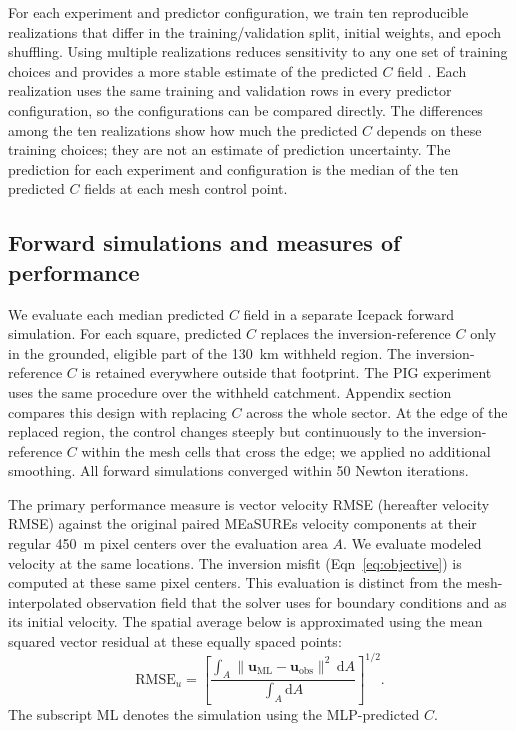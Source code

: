 \documentclass[review,jog]{igs}
\begin{document}
For each experiment and predictor configuration, we train ten reproducible
realizations that differ in the training/validation split, initial weights, and
epoch shuffling. Using multiple realizations reduces sensitivity to any one
set of training choices and provides a more stable estimate of the predicted
$C$ field \citep{hansen1990neural,breiman1996bagging}. Each realization uses the same training and validation rows in every predictor configuration, so the configurations can be compared directly. The differences among the ten realizations show how much the predicted $C$ depends on these training choices; they are not an estimate of prediction uncertainty. The prediction for each experiment and configuration is the median of the ten predicted $C$ fields at each mesh control point.

\subsection{Forward simulations and measures of performance}

We evaluate each median predicted $C$ field in a separate Icepack forward simulation. For each square, predicted $C$ replaces the inversion-reference $C$ only in the grounded, eligible part of the 130~km withheld region. The inversion-reference $C$ is retained
everywhere outside that footprint. The PIG experiment
uses the same procedure over the withheld catchment.
Appendix section~ compares this design with replacing $C$ across the whole sector.
At the edge of the replaced region, the control changes steeply but
continuously to the inversion-reference $C$ within the mesh cells that cross
the edge; we applied no additional smoothing. All forward simulations
converged within 50 Newton iterations.

The primary performance measure is vector velocity RMSE (hereafter velocity RMSE) against the original paired MEaSUREs velocity components at their regular 450~m pixel centers over the evaluation area $A$. We evaluate modeled velocity at the same locations. The inversion misfit (Eqn~\ref{eq:objective}) is computed at these same pixel centers. This evaluation is distinct from the mesh-interpolated observation field that the solver uses for boundary conditions and as its initial velocity. The spatial average below is approximated using the mean squared vector residual at these equally spaced points:
\begin{equation}
\label{eq:vector_rmse}
\mathrm{RMSE}_{u}=
\left[
\frac{
\int_A
\lVert\mathbf{u}_{\mathrm{ML}}-\mathbf{u}_{\mathrm{obs}}\rVert^2
\,\mathrm{d}A
}{
\int_A \mathrm{d}A
}
\right]^{1/2}.
\end{equation}
The subscript ML denotes the simulation using the MLP-predicted $C$.
\end{document}
